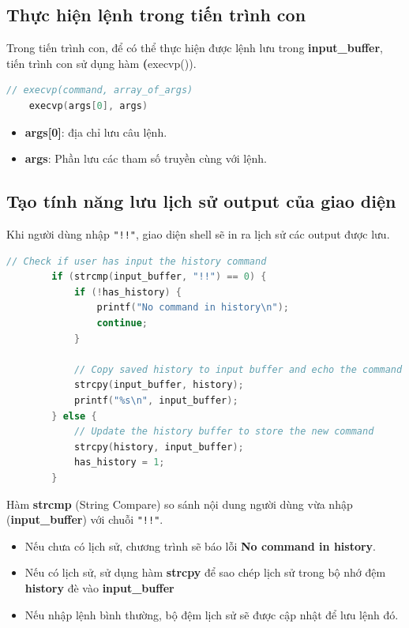\documentclass[12pt, letterpaper]{article}
\begin{document}
\subsection{Thực hiện lệnh trong tiến trình con}
Trong tiến trình con, để có thể thực hiện được lệnh lưu trong \textbf{input\_buffer}, tiến trình con sử dụng hàm \textbf(execvp()).
\begin{lstlisting}[language=C, caption={Sử dụng hàm \textbf{execvp()} để thực hiện lệnh}]
    // execvp(command, array_of_args)
    execvp(args[0], args)
\end{lstlisting}
\begin{itemize}
    \item \textbf{args[0]}: địa chỉ lưu câu lệnh.
    \item \textbf{args}: Phần lưu các tham số truyền cùng với lệnh.
\end{itemize}
\subsection{Tạo tính năng lưu lịch sử output của giao diện}
Khi người dùng nhập \texttt{"!!"}, giao diện shell sẽ in ra lịch sử các output được lưu.
\begin{lstlisting}[language=C, caption={Logic xử lý lệnh \texttt{"!!"}}]
    // Check if user has input the history command
        if (strcmp(input_buffer, "!!") == 0) {
            if (!has_history) {
                printf("No command in history\n");
                continue;
            }

            // Copy saved history to input buffer and echo the command
            strcpy(input_buffer, history);
            printf("%s\n", input_buffer);
        } else {
            // Update the history buffer to store the new command
            strcpy(history, input_buffer);
            has_history = 1;
        }
\end{lstlisting}
Hàm \textbf{strcmp} (String Compare) so sánh nội dung người dùng vừa nhập (\textbf{input\_buffer}) với chuỗi \texttt{"!!"}.\\
\begin{itemize}
    \item Nếu chưa có lịch sử, chương trình sẽ báo lỗi \textbf{No command in history}.
    \item Nếu có lịch sử, sử dụng hàm \textbf{strcpy} để sao chép lịch sử trong bộ nhớ đệm \textbf{history} đè vào \textbf{input\_buffer}
    \item Nếu nhập lệnh bình thường, bộ đệm lịch sử sẽ được cập nhật để lưu lệnh đó.
\end{itemize}
\end{document}
